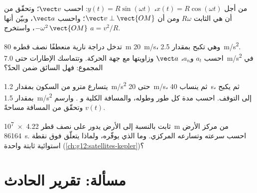 \begin{exercise}[$\star\star\star$]\label{exo:g12:kinematics-2d:12}
من أجل $x(t) = R\cos(\omega t)$، $y(t) = R\sin(\omega t)$: احسب
$\vect v$؛ وتحقّق من أن  هي الثابت $R\omega$ ومن أن
$\vect v \perp \vect{OM}$؛ واحسب $\vect a$، وبيّن أنها
$-\omega^2\,\vect{OM}$، واستخرج $a = v^2/R$.
\end{exercise}

\begin{exercise}[$\star\star\star$]\label{exo:g12:kinematics-2d:13}
تدخل دراجة نارية منعطفًا نصف قطره \qty{80}{m}  \qty{20}{m/s}،
وهي تكبح بمقدار \qty{2.5}{m/s^2}. احسب $a_t$ و$a_n$، 
$\vect a$ وزاويتها مع جهة الحركة. وتتماسك الإطارات
حتى \qty{7.0}{m/s^2} في المجموع: فهل السائق ضمن الحدّ؟
\end{exercise}

\begin{exercise}[$\star\star\star$]\label{exo:g12:kinematics-2d:14}
يتسارع مترو من السكون بمقدار \qty{1.2}{m/s^2} حتى \qty{20}{m/s}،
ثم ينساب \qty{40}{s}، ثم يكبح بمقدار \qty{1.5}{m/s^2} إلى التوقف.
احسب مدة كل طور وطوله، والمسافة الكلية و
. وارسم $v(t)$ وتحقّق من المسافة مساحةً.
\end{exercise}

\begin{exercise}[$\star\star\star$]\label{exo:g12:kinematics-2d:15}
 ثابت بالنسبة إلى الأرض يدور على نصف قطر \qty{4.22e7}{m} من
مركز الأرض  \qty{86164}{s}. احسب سرعته وتسارعه
المركزي. وما الذي يوفّره، ولماذا يتعلّق 
فوق نقطة استوائية ثابتة واحدة (\cref{ch:g12:satellites-kepler})؟
\end{exercise}

\section{مسألة: تقرير الحادث}

